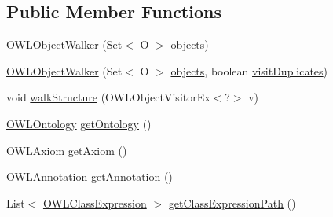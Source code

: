 \subsection*{Public Member Functions}
\begin{DoxyCompactItemize}
\item 
\hyperlink{classorg_1_1semanticweb_1_1owlapi_1_1util_1_1_o_w_l_object_walker_3_01_o_01extends_01_o_w_l_object_01_4_a4831b151438cf8db3d32d6c4e63d49e9}{O\-W\-L\-Object\-Walker} (Set$<$ O $>$ \hyperlink{classorg_1_1semanticweb_1_1owlapi_1_1util_1_1_o_w_l_object_walker_3_01_o_01extends_01_o_w_l_object_01_4_a0ed0ab47dfe25e23c03a4d2ab6e1fcae}{objects})
\item 
\hyperlink{classorg_1_1semanticweb_1_1owlapi_1_1util_1_1_o_w_l_object_walker_3_01_o_01extends_01_o_w_l_object_01_4_a13b28f15ebf8692b4d64b99996054e29}{O\-W\-L\-Object\-Walker} (Set$<$ O $>$ \hyperlink{classorg_1_1semanticweb_1_1owlapi_1_1util_1_1_o_w_l_object_walker_3_01_o_01extends_01_o_w_l_object_01_4_a0ed0ab47dfe25e23c03a4d2ab6e1fcae}{objects}, boolean \hyperlink{classorg_1_1semanticweb_1_1owlapi_1_1util_1_1_o_w_l_object_walker_3_01_o_01extends_01_o_w_l_object_01_4_a69d7678d92a2e82b7beee825505a2f42}{visit\-Duplicates})
\item 
void \hyperlink{classorg_1_1semanticweb_1_1owlapi_1_1util_1_1_o_w_l_object_walker_3_01_o_01extends_01_o_w_l_object_01_4_a1a1fecc6eb3d07a32a4e25e331474b27}{walk\-Structure} (O\-W\-L\-Object\-Visitor\-Ex$<$?$>$ v)
\item 
\hyperlink{interfaceorg_1_1semanticweb_1_1owlapi_1_1model_1_1_o_w_l_ontology}{O\-W\-L\-Ontology} \hyperlink{classorg_1_1semanticweb_1_1owlapi_1_1util_1_1_o_w_l_object_walker_3_01_o_01extends_01_o_w_l_object_01_4_afc92b89135a36c77a187a84c2b824f2d}{get\-Ontology} ()
\item 
\hyperlink{interfaceorg_1_1semanticweb_1_1owlapi_1_1model_1_1_o_w_l_axiom}{O\-W\-L\-Axiom} \hyperlink{classorg_1_1semanticweb_1_1owlapi_1_1util_1_1_o_w_l_object_walker_3_01_o_01extends_01_o_w_l_object_01_4_af6f66b6a419e6d5f51ec844bfb580f55}{get\-Axiom} ()
\item 
\hyperlink{interfaceorg_1_1semanticweb_1_1owlapi_1_1model_1_1_o_w_l_annotation}{O\-W\-L\-Annotation} \hyperlink{classorg_1_1semanticweb_1_1owlapi_1_1util_1_1_o_w_l_object_walker_3_01_o_01extends_01_o_w_l_object_01_4_a7bfc1cab91e000b80f89080d6bb084be}{get\-Annotation} ()
\item 
List$<$ \hyperlink{interfaceorg_1_1semanticweb_1_1owlapi_1_1model_1_1_o_w_l_class_expression}{O\-W\-L\-Class\-Expression} $>$ \hyperlink{classorg_1_1semanticweb_1_1owlapi_1_1util_1_1_o_w_l_object_walker_3_01_o_01extends_01_o_w_l_object_01_4_a45f4abfbe72e380787bf2e2b0e3a2333}{get\-Class\-Expression\-Path} ()

\end{DoxyCompactItemize}

